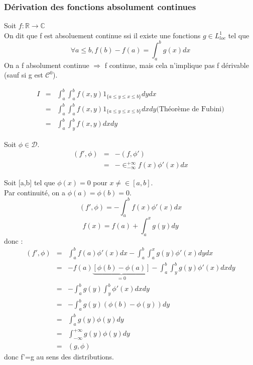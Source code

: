 \documentclass{article}
\begin{document}
\subsubsection{Dérivation des fonctions absolument continues}
Soit $f:\mathbb{R} \rightarrow \mathbb{C}$ \\
On dit que f est absoluement continue ssi il existe une fonctions $g\in L^1_{loc}$ tel que \[\forall a\leq b, f(b) - f(a) = \int_a^b g(x) dx\]
On a f absolument continue $\Rightarrow$ f continue, mais cela n'implique pas f dérivable (sauf si g est $\mathcal{C}^0$).



\begin{dem}[du lemme]
\begin{eqnarray*}
I&=& \int_a^b \int_a^b f(x,y) 1_{\{a\leq y \leq x \leq b\}} dy dx \\
&=& \int_a^b \int_a^b f(x,y) 1_{\{a\leq y \leq x \leq b\}} dx dy \text{(Théorème de Fubini)} \\
&=& \int_a^b \int_y^b f(x,y) dx dy
\end{eqnarray*}
\end{dem}

\begin{dem}[du théorème]
Soit $\phi \in \mathcal{D}$. 
\begin{eqnarray*}
(f',\phi) &=& -(f,\phi') \\
&=& -\in_{-\infty}^{+\infty} f(x) \phi'(x) dx 
\end{eqnarray*}

Soit [a,b] tel que $\phi(x)=0$ pour $x \neq\in [a,b]$. \\
Par continuité, on a $\phi(a)=\phi(b)=0$.
\[(f',\phi)=-\int_a^b f(x) \phi'(x)dx\]
\[f(x) = f(a) + \int_a^x g(y) dy\]
donc : 
\begin{eqnarray*}
(f',\phi) &=& \int_a^b f(a) \phi'(x)dx - \int_a^b \int_a^x g(y) \phi'(x) dy dx \\
&=& -f(a)\underbrace{\left[ \phi(b)-\phi(a) \right]}_{=0} - \int_a^b \int_y^b g(y) \phi'(x) dx dy \\
&=& -\int_a^b g(y) \int_y^b \phi'(x) dx dy \\
&=& -\int_a^b g(y) (\phi(b) -\phi(y)) dy \\
&=& \int_a^b g(y) \phi(y) dy \\
&=& \int_{-\infty}^{+\infty} g(y) \phi(y) dy \\
&=& (g,\phi)
\end{eqnarray*}
donc f'=g au sens des distributions.
\end{dem}
\end{document}
